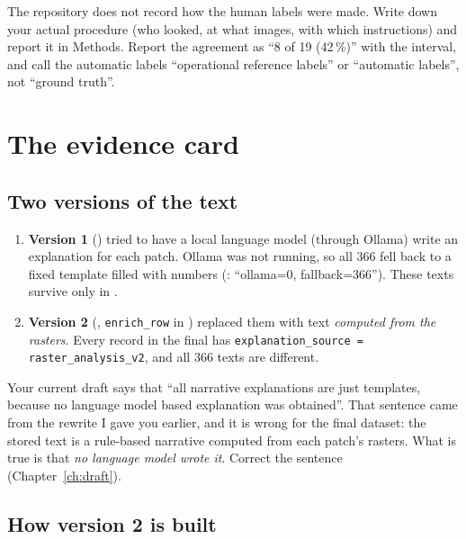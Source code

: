 \begin{foryourreport}
The repository does not record how the human labels were made. Write down your actual procedure (who looked, at what images, with which instructions) and report it in Methods. Report the agreement as ``8 of 19 (42\,\%)'' with the interval, and call the automatic labels ``operational reference labels'' or ``automatic labels'', not ``ground truth''.
\end{foryourreport}

\section{The evidence card}
\label{sec:card}

\subsection{Two versions of the text}

\begin{enumerate}
  \item \textbf{Version 1} () tried to have a local language model (through Ollama) write an explanation for each patch. Ollama was not running, so all 366 fell back to a fixed template filled with numbers (: ``ollama=0, fallback=366''). These texts survive only in .
  \item \textbf{Version 2} (, \texttt{enrich\_row} in ) replaced them with text \emph{computed from the rasters}. Every record in the final  has \texttt{explanation\_source = raster\_analysis\_v2}, and all 366 texts are different.
\end{enumerate}

\begin{newinfo}
Your current draft says that ``all narrative explanations are just templates, because no language model based explanation was obtained''. That sentence came from the rewrite I gave you earlier, and it is wrong for the final dataset: the stored text is a rule-based narrative computed from each patch's rasters. What is true is that \emph{no language model wrote it}. Correct the sentence (Chapter~\ref{ch:draft}).
\end{newinfo}

\subsection{How version 2 is built}

